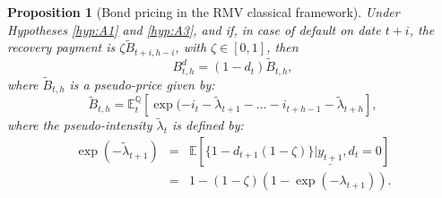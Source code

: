 \documentclass[
  12pt,
]{book}
\newtheorem{proposition}{Proposition}[chapter]
\theoremstyle{definition}
\theoremstyle{definition}
\theoremstyle{definition}
\theoremstyle{definition}
\theoremstyle{remark}
\begin{document}
\begin{proposition}[Bond pricing in the RMV classical framework]
\protect\hypertarget{prp:RMVclassical}{}\label{prp:RMVclassical}Under Hypotheses \ref{hyp:A1} and \ref{hyp:A3}, and if, in case of default on date \(t+i\), the recovery payment is \(\zeta \widetilde{B}_{t+i,h-i}\), with \(\zeta \in [0,1]\), then
\begin{equation}
B_{t,h}^d =  (1-d_t)\widetilde{B}_{t,h},\label{eq:BBcredit}
\end{equation}
where \(\widetilde{B}_{t,h}\) is a \emph{pseudo-price} given by:
\begin{equation}
\widetilde{B}_{t,h} = \mathbb{E}_t^{\mathbb{Q}} [\exp(-i_{t}-\tilde\lambda_{t+1}-\dots -i_{t+h-1}-\tilde\lambda_{t+h}],\label{eq:BtildeCredit}
\end{equation}
where the pseudo-intensity \(\tilde\lambda_{t}\) is defined by:
\begin{eqnarray}
\exp(-\tilde\lambda_{t+1}) &=&  \mathbb{E} [\{1 - d_{t+1} (1-\zeta)\}|\underline{y_{t+1}},d_t=0] \nonumber\\
&=&  1 - (1-\zeta) (1-\exp(-\lambda_{t+1})).\label{eq:pseudodefintens}
\end{eqnarray}
\end{proposition}
\end{document}
